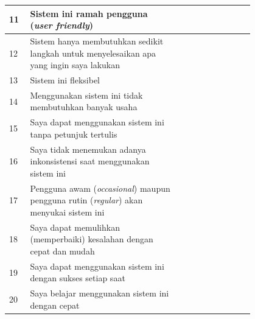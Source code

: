 \begin{longtable}{|p{0.05\linewidth}|p{0.5\linewidth}|p{0.05\linewidth}|p{0.05\linewidth}|p{0.05\linewidth}|p{0.05\linewidth}|p{0.05\linewidth}|}
      \hline
      11          & Sistem ini ramah pengguna (\textit{user friendly})                                                    &                                         &             &            &            &             \\
      \hline
      12          & Sistem hanya membutuhkan sedikit langkah untuk menyelesaikan apa yang ingin saya lakukan              &                                         &             &            &            &             \\
      \hline
      13          & Sistem ini fleksibel                                                                                  &                                         &             &            &            &             \\
      \hline
      14          & Menggunakan sistem ini tidak membutuhkan banyak usaha                                                 &                                         &             &            &            &             \\
      \hline
      15          & Saya dapat menggunakan sistem ini tanpa petunjuk tertulis                                             &                                         &             &            &            &             \\
      \hline
      16          & Saya tidak menemukan adanya inkonsistensi saat menggunakan sistem ini                                 &                                         &             &            &            &             \\
      \hline
      17          & Pengguna awam (\textit{occasional}) maupun pengguna rutin (\textit{regular}) akan menyukai sistem ini &                                         &             &            &            &             \\
      \hline
      18          & Saya dapat memulihkan (memperbaiki) kesalahan dengan cepat dan mudah                                  &                                         &             &            &            &             \\
      \hline
      19          & Saya dapat menggunakan sistem ini dengan sukses setiap saat                                           &                                         &             &            &            &             \\
      \hline
      20          & Saya belajar menggunakan sistem ini dengan cepat                                                      &                                         &             &            &            &             \\

\end{longtable}

